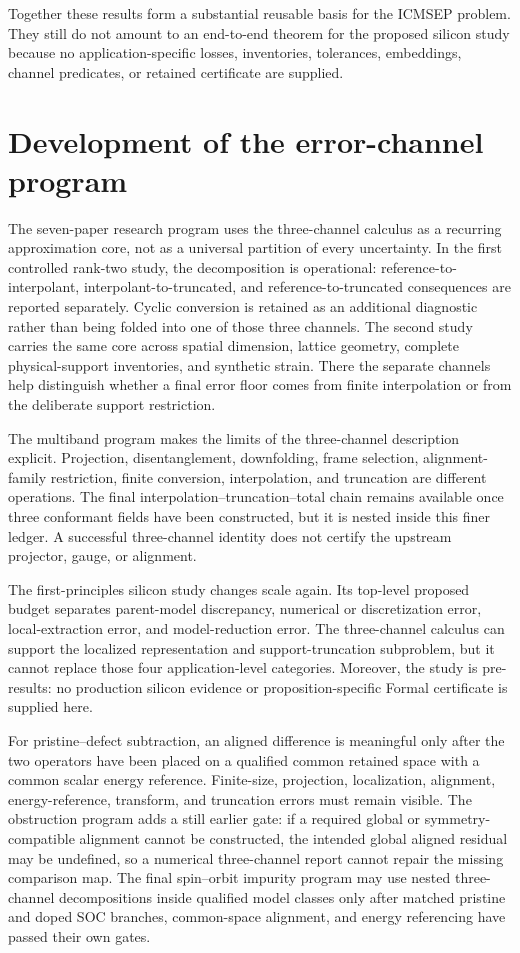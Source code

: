 Together these results form a substantial reusable basis for the ICMSEP problem.  They
still do not amount to an end-to-end theorem for the proposed silicon study because no
application-specific losses, inventories, tolerances, embeddings, channel predicates, or
retained certificate are supplied.

\section{Development of the error-channel program}
\label{sec:seven-paper-error-channel-development}

The seven-paper research program uses the three-channel calculus as a recurring
approximation core, not as a universal partition of every uncertainty.  In the first
controlled rank-two study, the decomposition is operational: reference-to-interpolant,
interpolant-to-truncated, and reference-to-truncated consequences are reported
separately.  Cyclic conversion is retained as an additional diagnostic rather than
being folded into one of those three channels.  The second study carries the same core
across spatial dimension, lattice geometry, complete physical-support inventories, and
synthetic strain.  There the separate channels help distinguish whether a final error
floor comes from finite interpolation or from the deliberate support restriction.

The multiband program makes the limits of the three-channel description explicit.
Projection, disentanglement, downfolding, frame selection, alignment-family restriction,
finite conversion, interpolation, and truncation are different operations.  The final
interpolation--truncation--total chain remains available once three conformant fields
have been constructed, but it is nested inside this finer ledger.  A successful
three-channel identity does not certify the upstream projector, gauge, or alignment.

The first-principles silicon study changes scale again.  Its top-level proposed budget
separates parent-model discrepancy, numerical or discretization error, local-extraction
error, and model-reduction error.  The three-channel calculus can support the localized
representation and support-truncation subproblem, but it cannot replace those four
application-level categories.  Moreover, the study is pre-results: no production
silicon evidence or proposition-specific Formal certificate is supplied here.

For pristine--defect subtraction, an aligned difference is meaningful only after the
two operators have been placed on a qualified common retained space with a common
scalar energy reference.  Finite-size, projection, localization, alignment,
energy-reference, transform, and truncation errors must remain visible.  The obstruction
program adds a still earlier gate: if a required global or symmetry-compatible
alignment cannot be constructed, the intended global aligned residual may be
undefined, so a numerical three-channel report cannot repair the missing comparison
map.  The final spin--orbit impurity program may use nested three-channel decompositions
inside qualified model classes only after matched pristine and doped SOC branches,
common-space alignment, and energy referencing have passed their own gates.

